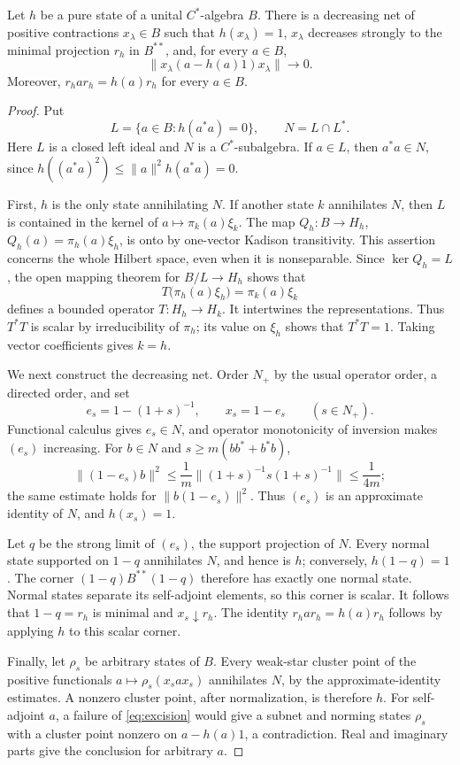\begin{lemma}\label{na:excision}
Let $h$ be a pure state of a unital $C^*$-algebra $B$.  There is a decreasing
net of positive contractions $x_\lambda\in B$ such that $h(x_\lambda)=1$,
$x_\lambda$ decreases strongly to the minimal projection $r_h$ in $B^{**}$,
and, for every $a\in B$,
\begin{equation}\label{eq:excision}
 \|x_\lambda(a-h(a)1)x_\lambda\|\longrightarrow0.
\end{equation}
Moreover, $r_h a r_h=h(a)r_h$ for every $a\in B$.
\end{lemma}
\begin{proof}
Put
\[
 L=\{a\in B:h(a^*a)=0\},\qquad N=L\cap L^*.
\]
Here $L$ is a closed left ideal and $N$ is a $C^*$-subalgebra.  If $a\in L$,
then $a^*a\in N$, since
$h((a^*a)^2)\le\|a\|^2h(a^*a)=0$.

First, $h$ is the only state annihilating $N$.  If another state $k$
annihilates $N$, then $L$ is contained in the kernel of
$a\mapsto\pi_k(a)\xi_k$.  The map
$Q_h:B\to H_h$, $Q_h(a)=\pi_h(a)\xi_h$, is onto by one-vector Kadison
transitivity.  This assertion concerns the whole Hilbert space, even when
it is nonseparable.  Since $\ker Q_h=L$, the open mapping theorem for
$B/L\to H_h$ shows that
\[
 T\bigl(\pi_h(a)\xi_h\bigr)=\pi_k(a)\xi_k
\]
defines a bounded operator $T:H_h\to H_k$.  It intertwines the
representations.  Thus $T^*T$ is scalar by irreducibility of $\pi_h$;
its value on $\xi_h$ shows that $T^*T=1$.  Taking vector coefficients gives
$k=h$.

We next construct the decreasing net.  Order $N_+$ by the usual operator
order, a directed order, and set
\[
 e_s=1-(1+s)^{-1},\qquad x_s=1-e_s \qquad(s\in N_+).
\]
Functional calculus gives $e_s\in N$, and operator monotonicity of
inversion makes $(e_s)$ increasing.  For $b\in N$ and
$s\ge m(bb^*+b^*b)$,
\[
 \|(1-e_s)b\|^2
 \le \frac1m\|(1+s)^{-1}s(1+s)^{-1}\|
 \le\frac1{4m};
\]
the same estimate holds for $\|b(1-e_s)\|^2$.  Thus $(e_s)$ is an
approximate identity of $N$, and $h(x_s)=1$.

Let $q$ be the strong limit of $(e_s)$, the support projection of $N$.
Every normal state supported on $1-q$ annihilates $N$, and hence is $h$;
conversely, $h(1-q)=1$.  The corner $(1-q)B^{**}(1-q)$ therefore has
exactly one normal state.  Normal states separate its self-adjoint
elements, so this corner is scalar.  It follows that $1-q=r_h$ is
minimal and $x_s\downarrow r_h$.  The identity $r_har_h=h(a)r_h$ follows
by applying $h$ to this scalar corner.

Finally, let $\rho_s$ be arbitrary states of $B$.  Every weak-star cluster
point of the positive functionals
$a\mapsto\rho_s(x_sax_s)$ annihilates $N$, by the approximate-identity
estimates.  A nonzero cluster point, after normalization, is therefore
$h$.  For self-adjoint $a$, a failure of \eqref{eq:excision} would give a
subnet and norming states $\rho_s$ with a cluster point nonzero on
$a-h(a)1$, a contradiction.  Real and imaginary parts give the conclusion
for arbitrary $a$.
\end{proof}


